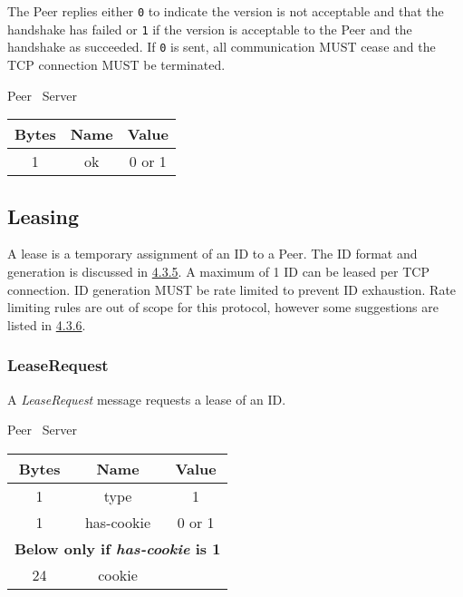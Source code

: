 The Peer replies either \texttt{0} to indicate the version is not acceptable and that the handshake has
failed or \texttt{1} if the version is acceptable to the Peer and the handshake as succeeded. If \texttt{0} is sent, all
communication MUST cease and the TCP connection MUST be terminated.

\begin{center}
    Peer \textrightarrow\ Server\\
    \begin{tabular}{|c|c|c|}
        \hline
        \textbf{Bytes} & \textbf{Name} & \textbf{Value} \\
        \hline
        1              & ok            & 0 or 1         \\
        \hline
    \end{tabular}
\end{center}

\subsection{Leasing}

A lease is a temporary assignment of an ID to a Peer. The ID format and generation is discussed in
\hyperlink{subsubsection.4.3.5}{4.3.5}. A maximum of 1 ID can be leased per TCP connection. ID generation MUST be
rate limited to prevent ID exhaustion. Rate limiting rules are out of scope for this protocol, however some
suggestions are listed in \hyperlink{subsubsection.4.3.6}{4.3.6}.

\subsubsection{LeaseRequest}

A \emph{LeaseRequest} message requests a lease of an ID.

\begin{center}
    Peer \textrightarrow\ Server\\
    \begin{tabular}{|c|c|c|}
        \hline
        \textbf{Bytes} & \textbf{Name} & \textbf{Value} \\
        \hline
        1              & type          & 1              \\
        \hline
        1              & has-cookie    & 0 or 1         \\
        \hline
        \multicolumn{3}{|c|}{\textbf{Below only if \emph{has-cookie} is 1} } \\
        \hline
        24             & cookie        &                \\
        \hline
    \end{tabular}
\end{center}

